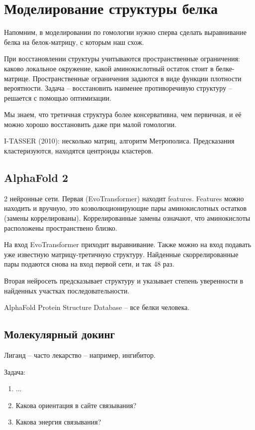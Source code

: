 \documentclass[main.tex]{subfiles}
\begin{document}
\section{Моделирование структуры белка}

Напомним, в моделировании по гомологии нужно сперва сделать выравнивание белка на белок-матрицу, с которым наш схож.

При восстановлении структуры учитываются пространственные ограничения: каково локальное окружение, какой аминокислотный остаток стоит в белке-матрице.
Пространственные ограничения задаются в виде функции плотности вероятности.
Задача -- восстановить наименее противоречивую структуру -- решается с помощью оптимизации.

Мы знаем, что третичная структура более консервативна, чем первичная, и её можно хорошо восстановить даже при малой гомологии.

I-TASSER (2010): несколько матриц, алгоритм Метрополиса.
Предсказания кластеризуются, находятся центроиды кластеров.

\subsection{AlphaFold 2}

2 нейронные сети.
Первая (EvoTransformer) находит features.
Features можно находить и вручную, это коэволюционирующие пары аминокислотных остатков (замены коррелированы).
Коррелированные замены означают, что аминокислоты расположены пространствено близко.

На вход EvoTransformer приходит выравнивание.
Также можно на вход подавать уже известную матрицу-третичную структуру.
Найденные скоррелированные пары подаются снова на вход первой сети, и так 48 раз.

Вторая нейросеть предсказывает структуру и указывает степень уверенности в найденных участках последовательности.

AlphaFold Protein Structure Database -- все белки человека.

\subsection{Молекулярный докинг}

Лиганд -- часто лекарство -- например, ингибитор.

Задача:

\begin{enumerate}[noitemsep]
	\item ...
	\item Какова ориентация в сайте связывания?
	\item Какова энергия связывания?
\end{enumerate}
\end{document}
